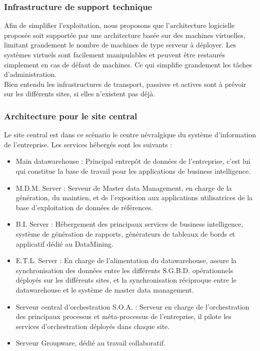 \subsubsection{Infrastructure de support technique}
Afin de simplifier l'exploitation, nous proposons que l'architecture logicielle proposée soit supportée par une architecture basée sur des machines virtuelles, limitant grandement le nombre de machines de type serveur à déployer.
Les systèmes virtuels sont facilement manipulables et peuvent être restaurés simplement en cas de défaut de machines. Ce qui simplifie grandement les tâches d'administration.\\
Bien entendu les infrastructures de transport, passives et actives sont à prévoir sur les différents sites, si elles n'existent pas déjà.

\subsubsection{Architecture pour le site central}

Le site central est dans ce scénario le centre névralgique du système d'information de l'entreprise. Les services hébergés sont les suivants :\\

\begin{itemize}
\item Main datawarehouse : Principal entrepôt de données de l'entreprise, c'est lui qui constitue la base de travail pour les applications de business intelligence.
\item M.D.M. Server : Serveur de Master data Management, en charge de la génération, du maintien, et de l'exposition aux applications utilisatrices de la base d'exploitation de données de références.
\item B.I. Server : Hébergement des principaux services de business intelligence, système de génération de rapports, générateurs de tableaux de bords et applicatif dédié au DataMining.
\item E.T.L. Server : En charge de l'alimentation du datawarehouse, assure la synchronisation des données entre les différents S.G.B.D. opérationnels déployés sur les différents sites, et la synchronisation réciproque entre le datawarehouse et le système de master data management.
\item Serveur central d'orchestration S.O.A. : Serveur en charge de l'orchestration des principaux processus et méta-processus de l'entreprise, il pilote les services d'orchestration déployés dans chaque site.
\item Serveur Groupware, dédié au travail collaboratif.
\end{itemize}


